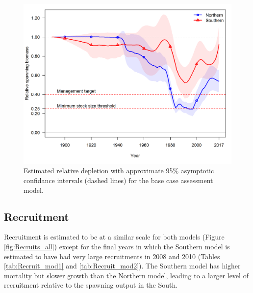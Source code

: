 \documentclass[12pt,]{article}
\begin{document}
\begin{figure}[htbp]
\centering
\includegraphics{r4ss/plots_compare/base_compare4_Bratio_uncertainty.png}
\caption{Estimated relative depletion with approximate 95\% asymptotic
confidance intervals (dashed lines) for the base case assessment model.
\label{fig:RelDeplete_all}}
\end{figure}

\FloatBarrier

\subsection*{Recruitment}\label{recruitment}

Recruitment is estimated to be at a similar scale for both models
(Figure \ref{fig:Recruits_all}) except for the final years in which the
Southern model is estimated to have had very large recruitments in 2008
and 2010 (Tables \ref{tab:Recruit_mod1} and \ref{tab:Recruit_mod2}). The
Southern model has higher mortality but slower growth than the Northern
model, leading to a larger level of recruitment relative to the spawning
output in the South.
\end{document}
